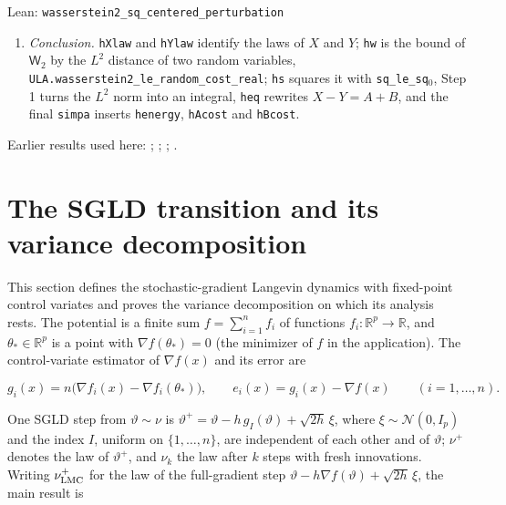 \documentclass[11pt,a4paper]{report}
\begin{document}
\begin{leanbox}{Lean: \texttt{wasserstein2\_\allowbreak{}sq\_\allowbreak{}centered\_\allowbreak{}perturbation}}
\begin{enumerate}
\item \emph{Conclusion.} \texttt{h\allowbreak{}Xlaw} and \texttt{h\allowbreak{}Ylaw} identify the laws of \(X\) and \(Y\); \texttt{hw} is the bound of \(\mathsf W_2\) by the \(L^2\) distance of two random variables, \texttt{ULA.\allowbreak{}wasserstein2\_\allowbreak{}le\_\allowbreak{}random\_\allowbreak{}cost\_\allowbreak{}real}; \texttt{hs} squares it with \texttt{sq\_\allowbreak{}le\_\allowbreak{}sq\ensuremath{{}_{0}}}, Step 1 turns the \(L^2\) norm into an integral, \texttt{heq} rewrites \(X-Y=A+B\), and the final \texttt{simpa} inserts \texttt{henergy}, \texttt{h\allowbreak{}Acost} and \texttt{h\allowbreak{}Bcost}.

\end{enumerate}
\end{leanbox}


Earlier results used here: \cite[Section~3.17.11]{LangevinLean2026ULASC}; \cite[Section~3.17.2]{LangevinLean2026ULASC}; \cite[Section~3.17.4]{LangevinLean2026ULASC}; \cite[Section~3.21.2]{LangevinLean2026ULASC}.
\section{\texorpdfstring{The SGLD transition and its variance decomposition}{The SGLD transition and its variance decomposition}}
\label{proof-module-AverageLMC-SGLDLaw-lean}


This section defines the stochastic-gradient Langevin dynamics with fixed-point control variates and proves the variance decomposition on which its analysis rests. The potential is a finite sum \(f=\sum_{i=1}^nf_i\) of functions \(f_i:\mathbb R^p\to\mathbb R\), and \(\theta_*\in\mathbb R^p\) is a point with \(\nabla f(\theta_*)=0\) (the minimizer of \(f\) in the application). The control-variate estimator of \(\nabla f(x)\) and its error are


\[g_i(x)=n\bigl(\nabla f_i(x)-\nabla f_i(\theta_*)\bigr),\qquad e_i(x)=g_i(x)-\nabla f(x)\qquad(i=1,\dots,n).\]


One SGLD step from \(\vartheta\sim\nu\) is \(\vartheta^+=\vartheta-h\,g_I(\vartheta)+\sqrt{2h}\,\xi\), where \(\xi\sim\mathcal N(0,I_p)\) and the index \(I\), uniform on \(\{1,\dots,n\}\), are independent of each other and of \(\vartheta\); \(\nu^+\) denotes the law of \(\vartheta^+\), and \(\nu_k\) the law after \(k\) steps with fresh innovations. Writing \(\nu^+_{\rm LMC}\) for the law of the full-gradient step \(\vartheta-h\nabla f(\vartheta)+\sqrt{2h}\,\xi\), the main result is
\end{document}
